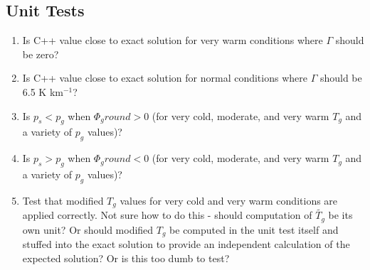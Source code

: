 \subsection{Unit Tests}

\begin{enumerate}
\item Is C++ value close to exact solution for very warm conditions where $\Gamma$ should be zero? 
\item Is C++ value close to exact solution for normal conditions where $\Gamma$ should be 6.5 K km$^{-1}$?
\item Is $p_s<p_g$ when $\Phi_ground>0$ (for very cold, moderate, and very warm $T_g$ and a variety of $p_g$ values)?
\item Is $p_s>p_g$ when $\Phi_ground<0$ (for very cold, moderate, and very warm $T_g$ and a variety of $p_g$ values)?
\item Test that modified $T_g$ values for very cold and very warm conditions are applied correctly. Not sure how to do this - should computation of $\widetilde{T_g}$ be its own unit? Or should modified $T_g$ be computed in the unit test itself and stuffed into the exact solution to provide an independent calculation of the expected solution? Or is this too dumb to test?
\end{enumerate}


